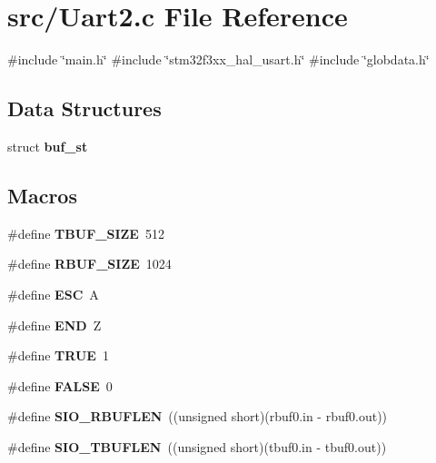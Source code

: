 \section{src/\+Uart2.c File Reference}
\label{_uart2_8c}
{\ttfamily \#include \char`\"{}main.\+h\char`\"{}}\newline
{\ttfamily \#include \char`\"{}stm32f3xx\+\_\+hal\+\_\+usart.\+h\char`\"{}}\newline
{\ttfamily \#include \char`\"{}globdata.\+h\char`\"{}}\newline
\subsection*{Data Structures}
\begin{DoxyCompactItemize}
\item 
struct \textbf{ buf\+\_\+st}
\end{DoxyCompactItemize}
\subsection*{Macros}
\begin{DoxyCompactItemize}
\item 
\#define \textbf{ T\+B\+U\+F\+\_\+\+S\+I\+ZE}~512
\item 
\#define \textbf{ R\+B\+U\+F\+\_\+\+S\+I\+ZE}~1024
\item 
\#define \textbf{ E\+SC}~\textquotesingle{}A\textquotesingle{}
\item 
\#define \textbf{ E\+ND}~\textquotesingle{}Z\textquotesingle{}
\item 
\#define \textbf{ T\+R\+UE}~1
\item 
\#define \textbf{ F\+A\+L\+SE}~0
\item 
\#define \textbf{ S\+I\+O\+\_\+\+R\+B\+U\+F\+L\+EN}~((unsigned short)(rbuf0.\+in -\/ rbuf0.\+out))
\item 
\#define \textbf{ S\+I\+O\+\_\+\+T\+B\+U\+F\+L\+EN}~((unsigned short)(tbuf0.\+in -\/ tbuf0.\+out))
\end{DoxyCompactItemize}
